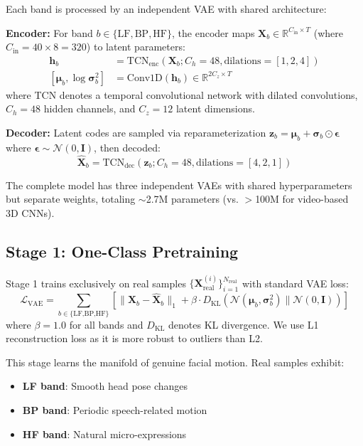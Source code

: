 \documentclass{article}
\begin{document}
Each band is processed by an independent VAE with shared architecture:

\textbf{Encoder:} For band $b \in \{\text{LF}, \text{BP}, \text{HF}\}$, the encoder maps $\mathbf{X}_b \in \mathbb{R}^{C_{\text{in}} \times T}$ (where $C_{\text{in}} = 40 \times 8 = 320$) to latent parameters:
\begin{align}
    \mathbf{h}_b &= \text{TCN}_{\text{enc}}(\mathbf{X}_b; C_h=48, \text{dilations}=[1,2,4]) \\
    [\boldsymbol{\mu}_b, \log\boldsymbol{\sigma}^2_b] &= \text{Conv1D}(\mathbf{h}_b) \in \mathbb{R}^{2C_z \times T}
\end{align}
where TCN denotes a temporal convolutional network with dilated convolutions, $C_h=48$ hidden channels, and $C_z=12$ latent dimensions.

\textbf{Decoder:} Latent codes are sampled via reparameterization $\mathbf{z}_b = \boldsymbol{\mu}_b + \boldsymbol{\sigma}_b \odot \boldsymbol{\epsilon}$ where $\boldsymbol{\epsilon} \sim \mathcal{N}(0, \mathbf{I})$, then decoded:
\begin{equation}
    \hat{\mathbf{X}}_b = \text{TCN}_{\text{dec}}(\mathbf{z}_b; C_h=48, \text{dilations}=[4,2,1])
\end{equation}

The complete model has three independent VAEs with shared hyperparameters but separate weights, totaling $\sim$2.7M parameters (vs. $>$100M for video-based 3D CNNs).

\subsection{Stage 1: One-Class Pretraining}

Stage 1 trains exclusively on real samples $\{\mathbf{X}^{(i)}_{\text{real}}\}_{i=1}^{N_{\text{real}}}$ with standard VAE loss:
\begin{equation}
\mathcal{L}_{\text{VAE}} = \sum_{b \in \{\text{LF,BP,HF}\}} \left[ \|\mathbf{X}_b - \hat{\mathbf{X}}_b\|_1 + \beta \cdot D_{\text{KL}}(\mathcal{N}(\boldsymbol{\mu}_b, \boldsymbol{\sigma}^2_b) \| \mathcal{N}(0, \mathbf{I})) \right]
\end{equation}
where $\beta=1.0$ for all bands and $D_{\text{KL}}$ denotes KL divergence. We use L1 reconstruction loss as it is more robust to outliers than L2.

This stage learns the manifold of genuine facial motion. Real samples exhibit:
\begin{itemize}
    \item \textbf{LF band}: Smooth head pose changes
    \item \textbf{BP band}: Periodic speech-related motion
    \item \textbf{HF band}: Natural micro-expressions
\end{itemize}
\end{document}
